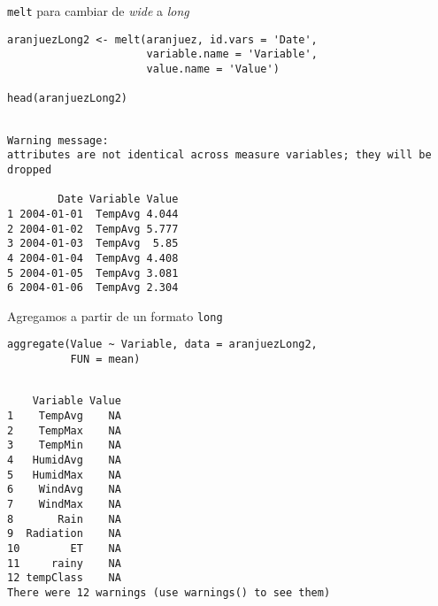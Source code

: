 \documentclass[xcolor={usenames,svgnames,dvipsnames}]{beamer}
\begin{document}
\begin{frame}[label={sec:org8f2a0d4},fragile]{\texttt{melt} para cambiar de \emph{wide} a \emph{long}}
 \lstset{language=r,label= ,caption= ,captionpos=b,numbers=none}
\begin{lstlisting}
aranjuezLong2 <- melt(aranjuez, id.vars = 'Date',
                      variable.name = 'Variable',
                      value.name = 'Value')

head(aranjuezLong2)
\end{lstlisting}

\begin{verbatim}

Warning message:
attributes are not identical across measure variables; they will be dropped

        Date Variable Value
1 2004-01-01  TempAvg 4.044
2 2004-01-02  TempAvg 5.777
3 2004-01-03  TempAvg  5.85
4 2004-01-04  TempAvg 4.408
5 2004-01-05  TempAvg 3.081
6 2004-01-06  TempAvg 2.304
\end{verbatim}
\end{frame}

\begin{frame}[label={sec:org0e9c932},fragile]{Agregamos a partir de un formato \texttt{long}}
 \lstset{language=r,label= ,caption= ,captionpos=b,numbers=none}
\begin{lstlisting}
aggregate(Value ~ Variable, data = aranjuezLong2,
          FUN = mean)
\end{lstlisting}

\begin{verbatim}

    Variable Value
1    TempAvg    NA
2    TempMax    NA
3    TempMin    NA
4   HumidAvg    NA
5   HumidMax    NA
6    WindAvg    NA
7    WindMax    NA
8       Rain    NA
9  Radiation    NA
10        ET    NA
11     rainy    NA
12 tempClass    NA
There were 12 warnings (use warnings() to see them)
\end{verbatim}
\end{frame}
\end{document}
